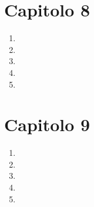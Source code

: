 \documentclass[ paper=a4
              , pagesize
              , fontsize=12pt
              , twoside=true
              , BCOR=5mm
              , DIV=calc
              , bibliography=totoc
              , final
              , version=last
              ]{scrbook}
\begin{document}
\section*{Capitolo 8}
\begin{enumerate}
    \item
    \item
    \item
    \item
    \item
\end{enumerate}
\section*{Capitolo 9}
\begin{enumerate}
    \item
    \item
    \item
    \item
    \item
\end{enumerate}
\end{document}
